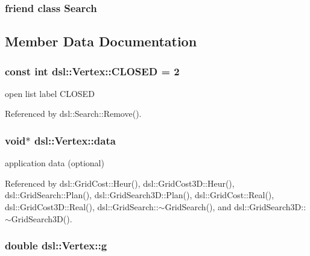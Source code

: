 \subsubsection[{\-Search}]{\setlength{\rightskip}{0pt plus 5cm}friend class {\bf \-Search}\hspace{0.3cm}{\ttfamily  [friend]}}\label{classdsl_1_1Vertex_aea88561fddd2e924cebf793f0cfdc8b6}


\subsection{\-Member \-Data \-Documentation}
\subsubsection[{\-C\-L\-O\-S\-E\-D}]{\setlength{\rightskip}{0pt plus 5cm}const int {\bf dsl\-::\-Vertex\-::\-C\-L\-O\-S\-E\-D} = 2\hspace{0.3cm}{\ttfamily  [static, protected]}}\label{classdsl_1_1Vertex_a6f1927e13f5c9c52fe241d379790ecc4}


open list label \-C\-L\-O\-S\-E\-D 



\-Referenced by dsl\-::\-Search\-::\-Remove().

\subsubsection[{data}]{\setlength{\rightskip}{0pt plus 5cm}void$\ast$ {\bf dsl\-::\-Vertex\-::data}}\label{classdsl_1_1Vertex_a2c6f027591db54c5fbf5e50e27def3a0}


application data (optional) 



\-Referenced by dsl\-::\-Grid\-Cost\-::\-Heur(), dsl\-::\-Grid\-Cost3\-D\-::\-Heur(), dsl\-::\-Grid\-Search\-::\-Plan(), dsl\-::\-Grid\-Search3\-D\-::\-Plan(), dsl\-::\-Grid\-Cost\-::\-Real(), dsl\-::\-Grid\-Cost3\-D\-::\-Real(), dsl\-::\-Grid\-Search\-::$\sim$\-Grid\-Search(), and dsl\-::\-Grid\-Search3\-D\-::$\sim$\-Grid\-Search3\-D().

\subsubsection[{g}]{\setlength{\rightskip}{0pt plus 5cm}double {\bf dsl\-::\-Vertex\-::g}}\label{classdsl_1_1Vertex_a1792e5abf07174d4e24e5dd3d3fb6e12}


